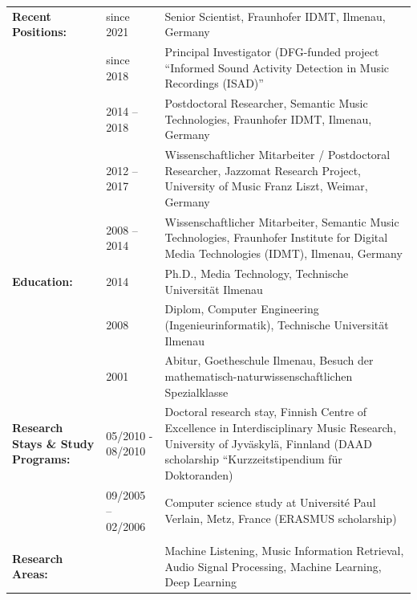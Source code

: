\documentclass[8pt,a4paper]{article}
\begin{document}
\begin{tabular}{p{3.1cm}p{3.0cm}p{10cm}}
{\bf Recent Positions:}  
& since 2021  & Senior Scientist, Fraunhofer IDMT, Ilmenau, Germany \\

& since 2018 & Principal Investigator (DFG-funded project ``Informed Sound Activity Detection in Music Recordings (ISAD)'' \\

& 2014 -- 2018 & Postdoctoral Researcher, Semantic Music Technologies, Fraunhofer IDMT, Ilmenau, Germany \\
{\bf } & 2012 -- 2017 &	Wissenschaftlicher Mitarbeiter / Postdoctoral Researcher, Jazzomat Research Project, University of Music Franz Liszt, Weimar, Germany\\
{\bf } & 2008 -- 2014 &	Wissenschaftlicher Mitarbeiter, Semantic Music Technologies, Fraunhofer Institute for Digital Media Technologies (IDMT), Ilmenau, Germany \bigskip\\
%
{\bf Education:}  
{\bf } & 2014 &	Ph.D., Media Technology, Technische Universit{\"a}t Ilmenau\\
{\bf } & 2008 &	Diplom, Computer Engineering (Ingenieurinformatik), Technische Universit{\"a}t Ilmenau\\
{\bf } & 2001 &	Abitur, Goetheschule Ilmenau, Besuch der mathematisch-naturwissenschaftlichen Spezialklasse \bigskip\\
%
{\bf Research Stays \& Study Programs:}&
 05/2010 - 08/2010 & Doctoral research stay, Finnish Centre of Excellence in Interdisciplinary Music Research, University of Jyv{\"a}skyl{\"a}, Finnland (DAAD scholarship ``Kurzzeitstipendium f{\"u}r Doktoranden)\\
{\bf } & 09/2005 -- 02/2006 & Computer science study at Universit{\'e} Paul Verlain, Metz, France (ERASMUS scholarship)\\
\bigskip\\
%
{\bf Research Areas:}& 
{\bf } & Machine Listening, Music Information Retrieval, Audio Signal Processing, Machine Learning, Deep Learning
\end{tabular}

\pagebreak[4]\clearpage
\end{document}
